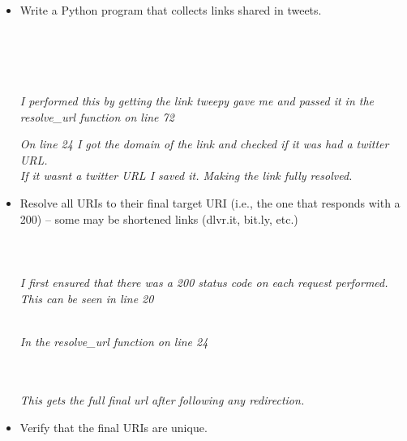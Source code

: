 \documentclass[12pt]{article}
\begin{document}
\begin{itemize}
    \item Write a Python program that collects links shared in tweets.
        
        \emph{\\ \\ \color{blue}{Answer:}}
        \emph{\\ \\I performed this by getting the link tweepy gave me and passed it in the resolve\_url function on line 72}
        
        \emph{On line 24 I got the domain of the link and checked if it was had a twitter URL.\\ If it wasnt a twitter URL I saved it. Making the link fully resolved.}
    \item Resolve all URIs to their final target URI (i.e., the one that responds with a 200) -- some may be shortened links (dlvr.it, bit.ly, etc.)
        \emph{\\ \\\color{blue}{Answer:}}
        \emph{\\ \\ I first ensured that there was a 200 status code on each request performed. This can be seen in line 20}
        
        \emph{\\In the resolve\_url function on line 24}
        
         \emph{\\ \\This gets the full final url after following any redirection.}
        
        
    \item Verify that the final URIs are unique.
        \emph{\\  \color{blue}{Answer:}}


\end{itemize}
\end{document}
